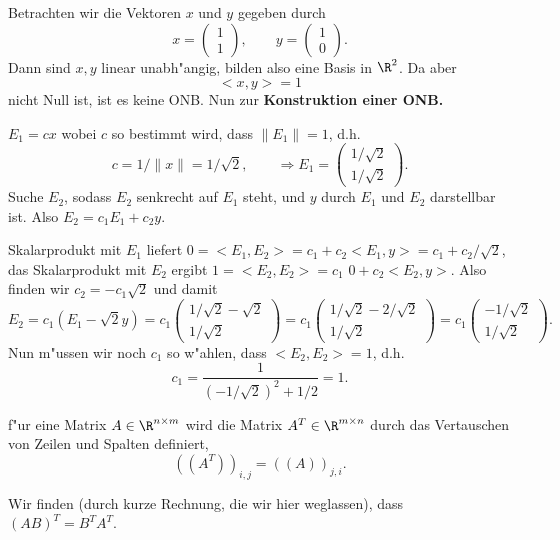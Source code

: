 \begin{bspX}
Betrachten wir die Vektoren $x$ und $y$ gegeben durch 
$$ x= \left(\begin{array}{c} 1\\ 1\end{array}\right),\qquad y =  \left(\begin{array}{c} 1\\ 0\end{array}\right).$$
Dann sind $x,y$ linear unabh"angig, bilden also eine Basis in $\R^2$. Da aber
$$ <x,y> = 1$$
nicht Null ist, ist es keine ONB. Nun zur {\bf Konstruktion einer ONB.}

 $ E_1 =c x$ wobei $c$ so bestimmt wird, dass $\|E_1\|=1$, d.h.
$$ c = 1/\|x\| = 1/\sqrt{2},\qquad \Rightarrow 
E_1 = \left(\begin{array}{c} 1/\sqrt{2}\\ 1/\sqrt{2}\end{array}\right).
$$
 Suche $E_2$, sodass $E_2$ senkrecht auf $E_1$ steht, und $y$ 
durch $E_1$ und $E_2$ darstellbar ist. Also $ E_2 = c_1E_1+c_2 y$.

Skalarprodukt mit $E_1$ liefert $ 0 = <E_1, E_2> = c_1 + c_2 <E_1, y> = c_1+c_2/\sqrt{2}$,
das Skalarprodukt mit $E_2$ ergibt $ 1 = <E_2, E_2> = c_1\,\, 0 + c_2 <E_2, y>$.
Also finden wir $ c_2 = - c_1\sqrt{2}$ und damit
$$ E_2 = c_1 (E_1 - \sqrt{2} y)
= c_1  \left(\begin{array}{c} 1/\sqrt{2}-\sqrt{2}\\ 1/\sqrt{2}\end{array}\right)
= c_1  \left(\begin{array}{c} 1/\sqrt{2}-2/\sqrt{2}\\ 1/\sqrt{2}\end{array}\right)
= c_1  \left(\begin{array}{c} -1/\sqrt{2}\\ 1/\sqrt{2}\end{array}\right)
.$$
Nun m"ussen wir noch $c_1$ so w"ahlen, dass $<E_2,E_2>=1$, d.h.
$$ c_1 
= \frac 1 {(-1/\sqrt{2})^2 + 1/2}
= 1.$$
\end{bspX}

\begin{sdefi} f"ur eine Matrix $A\in \R^{n\times m}$ wird die Matrix 
$A^T\in \R^{m\times n}$ durch das Vertauschen von Zeilen und Spalten
definiert,
$$ ((A^T))_{i,j} = ((A))_{j,i}.$$
\end{sdefi}
Wir finden (durch kurze Rechnung, die wir hier weglassen), dass $(A B)^T = B^T A^T$.

